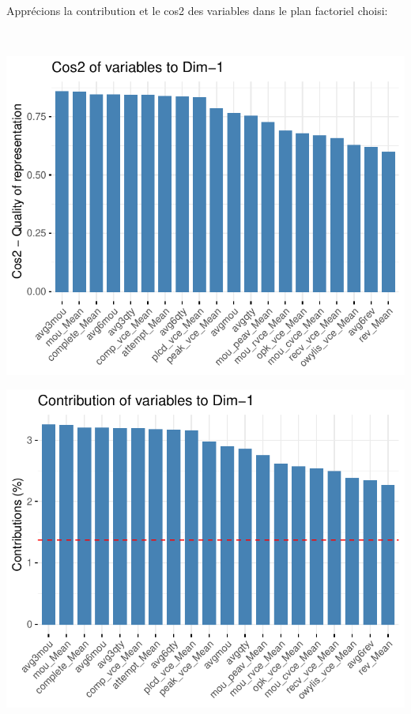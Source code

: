 \documentclass[]{imsart}
\numberwithin{equation}{section}
\theoremstyle{plain}
\begin{document}
~

~

Apprécions la contribution et le cos2 des variables dans le plan factoriel choisi:

~

\begin{flushleft}\includegraphics{Analyse_Exploratoire_Projet_files/figure-latex/unnamed-chunk-15-1} \end{flushleft}

\begin{flushleft}\includegraphics{Analyse_Exploratoire_Projet_files/figure-latex/unnamed-chunk-15-2} \end{flushleft}
\end{document}
